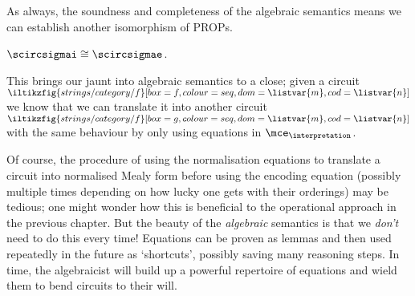 As always, the soundness and completeness of the algebraic semantics means we
can establish another isomorphism of PROPs.

\begin{corollary}
    \(\scircsigmai \cong \scircsigmae\).
\end{corollary}

This brings our jaunt into algebraic semantics to a close; given a circuit \(
\iltikzfig{strings/category/f}[box=f,colour=seq,dom=\listvar{m},cod=\listvar{n}]
\) we know that we can translate it into another circuit \(
\iltikzfig{strings/category/f}[box=g,colour=seq,dom=\listvar{m},cod=\listvar{n}]
\) with the same behaviour by only using equations in \(\mce_\interpretation\).

Of course, the procedure of using the normalisation equations to translate a
circuit into normalised Mealy form before using the encoding equation (possibly
multiple times depending on how lucky one gets with their orderings) may be
tedious; one might wonder how this is beneficial to the operational approach in
the previous chapter.
But the beauty of the \emph{algebraic} semantics is that we \emph{don't} need to
do this every time!
Equations can be proven as lemmas and then used repeatedly in the future as
`shortcuts', possibly saving many reasoning steps.
In time, the algebraicist will build up a powerful repertoire of equations and
wield them to bend circuits to their will.